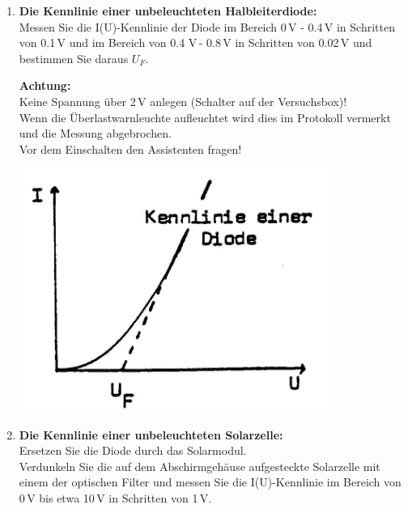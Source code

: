 \begin{enumerate}
	\item \textbf{Die Kennlinie einer unbeleuchteten Halbleiterdiode:}\\
		Messen Sie die I(U)-Kennlinie der Diode im Bereich 0\,V - 0.4\,V in Schritten von 0.1\,V und im Bereich von 0.4 V\,- 0.8\,V in Schritten von 0.02\,V und bestimmen Sie daraus $U_F$.\\
		\begin{minipage}{0.6\textwidth}
		\textbf{Achtung: }\\
		Keine Spannung über 2\,V anlegen (Schalter auf der Versuchsbox)!\\
		Wenn die Überlastwarnleuchte aufleuchtet wird dies im Protokoll vermerkt und die Messung abgebrochen.\\
		Vor dem Einschalten den Assistenten fragen!
		\end{minipage}
		\begin{minipage}{0.4\textwidth}
			\includegraphics[width=0.8\textwidth]{Versuch_17-18/Abbildungen/Bild15.jpg}
			\label{fig:Bild15}
		\end{minipage}
	\item \textbf{Die Kennlinie einer unbeleuchteten Solarzelle:}\\
		Ersetzen Sie die Diode durch das Solarmodul.\\
		Verdunkeln Sie die auf dem Abschirmgehäuse aufgesteckte Solarzelle mit einem der optischen Filter und messen Sie die I(U)-Kennlinie im Bereich von 0\,V bis etwa 10\,V in Schritten von 1\,V.
 

\end{enumerate}
